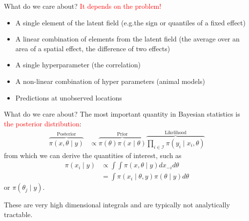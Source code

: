 \documentclass[
  ignorenonframetext,
]{beamer}
\providecommand{\tightlist}{%
  \setlength{\itemsep}{0pt}\setlength{\parskip}{0pt}}
\begin{document}
\begin{frame}{What do we care about?}
\protect\hypertarget{what-do-we-care-about}{}
\textcolor{red}{It depends on the problem!}

\begin{itemize}[<+->]
\tightlist
\item
  A single element of the latent field (e.g.the sign or quantiles of a
  fixed effect)
\item
  A linear combination of elements from the latent field (the average
  over an area of a spatial effect, the difference of two effects)
\item
  A single hyperparameter (the correlation)
\item
  A non-linear combination of hyper parameters (animal models)
\item
  Predictions at unobserved locations
\end{itemize}
\end{frame}

\begin{frame}{What do we care about?}
\protect\hypertarget{what-do-we-care-about-1}{}
The most important quantity in Bayesian statistics is
\textcolor{red}{the posterior distribution}: \[
\begin{aligned}
\overbrace{\pi({x}, {\theta}\mid{y})}^{{\text{Posterior}}} &\propto \overbrace{\pi({\theta}) \pi({x}\mid{\theta})}^{{\text{Prior}}} \overbrace{\prod_{i \in \mathcal{I}}\pi(y_i \mid x_i, {\theta})}^{{\text{Likelihood}}}
\end{aligned}
\] from which we can derive the quantities of interest, such as \[
    \begin{aligned}
        {\pi(x_i \mid {y})} &\propto \int \int \pi({x}, {\theta}\mid{y}) d{x}_{-i} d{\theta}\\
        &= {\int \pi(x_i \mid {\theta}, {y}) \pi({\theta} \mid {y}) d{\theta}}
    \end{aligned}
\] or \(\pi(\theta_j\mid {y})\).

These are very high dimensional integrals and are typically not
analytically tractable.
\end{frame}
\end{document}

